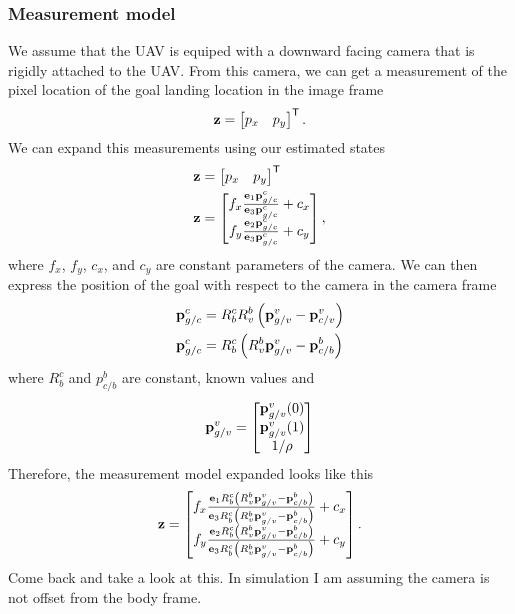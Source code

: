 \subsubsection{Measurement model}
We assume that the UAV is equiped with a downward facing camera that is rigidly
attached to the UAV. From this camera, we can get a measurement of the pixel
location of the goal landing location in the image frame
\begin{equation}
  \boldsymbol{\mathrm{z}} =
  \begin{bmatrix}
    p_x & p_y
  \end{bmatrix}^{\mathsf{T}}.
\end{equation}
We can expand this measurements using our estimated states
\begin{align}
  \boldsymbol{\mathrm{z}} &=
  \begin{bmatrix}
    p_x & p_y
  \end{bmatrix}^{\mathsf{T}} \\
  \boldsymbol{\mathrm{z}} &=
  \begin{bmatrix}
    f_x \frac{\boldsymbol{\mathrm{e}}_1 \boldsymbol{\mathrm{p}}_{g/c}^c}{\boldsymbol{\mathrm{e}}_3 \boldsymbol{\mathrm{p}}_{g/c}^c} + c_x \\
    f_y \frac{\boldsymbol{\mathrm{e}}_2 \boldsymbol{\mathrm{p}}_{g/c}^c}{\boldsymbol{\mathrm{e}}_3 \boldsymbol{\mathrm{p}}_{g/c}^c} + c_y
  \end{bmatrix},
\end{align}
where $f_x$, $f_y$, $c_x$, and $c_y$ are constant parameters of the camera. We
can then express the position of the goal with respect to the camera in the
camera frame 
\begin{align}
  \boldsymbol{\mathrm{p}}_{g/c}^c &= R_b^c R_v^b \left(\boldsymbol{\mathrm{p}}_{g/v}^v -
    \boldsymbol{\mathrm{p}}_{c/v}^v\right) \\
    \boldsymbol{\mathrm{p}}_{g/c}^c &= R_b^c \left(R_v^b \boldsymbol{\mathrm{p}}_{g/v}^v -
    \boldsymbol{\mathrm{p}}_{c/b}^b\right)
\end{align}
where $R_b^c$ and $p_{c/b}^b$ are constant, known values and
\begin{equation}
  \boldsymbol{\mathrm{p}}_{g/v}^v =
    \begin{bmatrix}
      \boldsymbol{\mathrm{p}}_{g/v}^v(0) \\
      \boldsymbol{\mathrm{p}}_{g/v}^v(1) \\
      1 / \rho
    \end{bmatrix}
\end{equation}
Therefore, the measurement model expanded looks like this
\begin{equation}
  \boldsymbol{\mathrm{z}} =
  \begin{bmatrix}
    f_x \frac{\boldsymbol{\mathrm{e}}_1 R_b^c \left(R_v^b \boldsymbol{\mathrm{p}}_{g/v}^v - \boldsymbol{\mathrm{p}}_{c/b}^b\right)}{\boldsymbol{\mathrm{e}}_3 R_b^c \left(R_v^b \boldsymbol{\mathrm{p}}_{g/v}^v - \boldsymbol{\mathrm{p}}_{c/b}^b\right)} + c_x \\
    f_y \frac{\boldsymbol{\mathrm{e}}_2 R_b^c \left(R_v^b \boldsymbol{\mathrm{p}}_{g/v}^v - \boldsymbol{\mathrm{p}}_{c/b}^b\right)}{\boldsymbol{\mathrm{e}}_3 R_b^c \left(R_v^b \boldsymbol{\mathrm{p}}_{g/v}^v - \boldsymbol{\mathrm{p}}_{c/b}^b\right)} + c_y
  \end{bmatrix}.
\end{equation}
\TODO Come back and take a look at this. In simulation I am assuming the camera
is not offset from the body frame.

